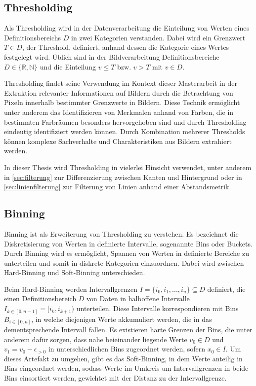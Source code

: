 \subsection{Thresholding}
\label{sec:thresholding}

Als Thresholding wird in der Datenverarbeitung die Einteilung von Werten eines Definitionsbereichs $D$ in zwei Kategorien verstanden. Dabei wird ein Grenzwert $T \in D$, der Threshold, definiert, anhand dessen die Kategorie eines Wertes festgelegt wird. Üblich sind in der Bildverarbeitung Definitionsbereiche $D \in \{\mathbb{R}, \mathbb{N}\}$ und die Einteilung $v \leq T$ bzw. $v > T$ mit $v \in D$.

Thresholding findet seine Verwendung im Kontext dieser Masterarbeit in der Extraktion relevanter Informationen auf Bildern durch die Betrachtung von Pixeln innerhalb bestimmter Grenzwerte in Bildern. Diese Technik ermöglicht unter anderem das Identifizieren von Merkmalen anhand von Farben, die in bestimmten Farbräumen besonders hervorgehoben sind und durch Thresholding eindeutig identifiziert werden können. Durch Kombination mehrerer Thresholds können komplexe Sachverhalte und Charakteristiken aus Bildern extrahiert werden.

In dieser Thesis wird Thresholding in vielerlei Hinsicht verwendet, unter anderem in \autoref{sec:filterung} zur Differenzierung zwischen Kanten und Hintergrund oder in \autoref{sec:linienfilterung} zur Filterung von Linien anhand einer Abstandsmetrik.


\subsection{Binning}
\label{sec:binning}

Binning ist als Erweiterung von Thresholding zu verstehen. Es bezeichnet die Diskretisierung von Werten in definierte Intervalle, sogenannte Bins oder Buckets. Durch Binning wird es ermöglicht, Spannen von Werten in definierte Bereiche zu unterteilen und somit in diskrete Kategorien einzuordnen. Dabei wird zwischen Hard-Binning und Soft-Binning unterschieden.

Beim Hard-Binning werden Intervallgrenzen $I = \{i_0, i_1, ..., i_n\} \subseteq D$ definiert, die einen Definitionsbereich $D$ von Daten in halboffene Intervalle $I_{k \in [0, n-1]} = [i_k, i_{k+1})$ unterteilen. Diese Intervalle korrespondieren mit Bins $B_{i \in [0, n]}$, in welche diejenigen Werte akkumuliert werden, die in das dementsprechende Intervall fallen. Es existieren harte Grenzen der Bins, die unter anderem dafür sorgen, dass nahe beieinander liegende Werte $v_0 \in D$ und $v_1 = v_0 - \epsilon_{>0}$ in unterschiedlichen Bins zugeordnet werden, sofern $x_0 \in I$. Um dieses Artefakt zu umgehen, gibt es das Soft-Binning, in dem Werte anteilig in Bins eingeordnet werden, sodass Werte im Umkreis um Intervallgrenzen in beide Bins einsortiert werden, gewichtet mit der Distanz zu der Intervallgrenze.

